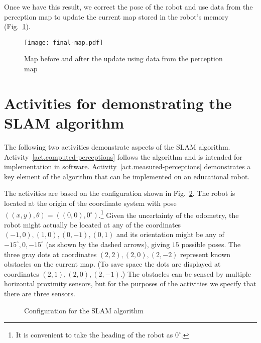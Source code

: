 Once we have this result, we correct the pose of the robot and use data from the perception map to update the current map stored in the robot's memory (Fig.~\ref{fig.final-map}).

\begin{figure}
\begin{center}
\texttt{[image: final-map.pdf]}
\end{center}
\caption{Map before and after the update using data from the perception map}\label{fig.final-map}
\end{figure}
\medskip

\section{Activities for demonstrating the SLAM algorithm}\label{s.slam-activities}

The following two activities demonstrate aspects of the SLAM algorithm. Activity~\ref{act.computed-perceptions} follows the algorithm and is intended for implementation in software. Activity~\ref{act.measured-perceptions} demonstrates a key element of the algorithm that can be implemented on an educational robot.

The activities are based on the configuration shown in Fig.~\ref{fig.slam-config}. The robot is located at the origin of the coordinate system with pose $((x,y),\theta)=((0,0),0^\circ)$.\footnote{It is convenient to take the heading of the robot as $0^\circ$.} Given the uncertainty of the odometry, the robot might actually be located at any of the coordinates $(-1,0), (1,0), (0,-1), (0,1)$ and its orientation might be any of $-15^\circ, 0, -15^\circ$ (as shown by the dashed arrows), giving $15$ possible poses. The three gray dots at coordinates $(2,2), (2,0), (2,-2)$ represent known obstacles on the current map. (To save space the dots are displayed at coordinates $(2,1), (2,0), (2,-1)$.) The obstacles can be sensed by multiple horizontal proximity sensors, but for the purposes of the activities we specify that there are three sensors.

\begin{figure}
\begin{center}
\caption{Configuration for the SLAM algorithm}\label{fig.slam-config}
\end{center}
\end{figure}

